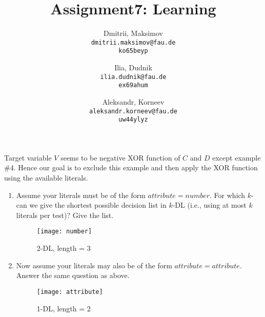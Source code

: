 \documentclass{homework}
\title{Assignment7: Learning}
\author{
  Dmitrii, Maksimov\\
  \texttt{dmitrii.maksimov@fau.de} \\
  \texttt{ko65beyp}
  \and
  Ilia, Dudnik\\
  \texttt{ilia.dudnik@fau.de}\\
  \texttt{ex69ahum}
  \and
  Aleksandr, Korneev\\
  \texttt{aleksandr.korneev@fau.de}\\
  \texttt{uw44ylyz}
}
\begin{document}
\maketitle


Target variable $V$ seems to be negative XOR function of $C$ and $D$ except example \#4. Hence our goal is to exclude this example and then apply the XOR function using the available literals.
\begin{enumerate}
	\item Assume your literals must be of the form $attribute = number$. For which $k$-can we give the shortest possible decision list in $k$-DL (i.e., using at most $k$ literals per test)? Give the list.
	\begin{figure}[h]
	    \centering
	    \texttt{[image: number]}
	    \caption{2-DL, length = 3}
	\end{figure}
	\item Now assume your literals may also be of the form $attribute = attribute.$ Answer the same question as above.
	\begin{figure}[h]
	    \centering
	    \texttt{[image: attribute]}
	    \caption{1-DL, length = 2}
	\end{figure}
\end{enumerate}	
\end{document}
